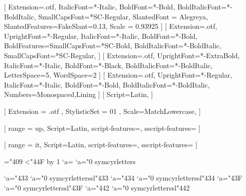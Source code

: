 
% 
%


\setmainfont{Alegreya}[
  Extension=.otf,
  ItalicFont=*-Italic,
  BoldFont=*-Bold,
  BoldItalicFont=*-BoldItalic,
  SmallCapsFont=*SC-Regular,
  SlantedFont = Alegreya,
  SlantedFeatures={FakeSlant=0.13},
  Scale = 0.93925
]
\setsansfont{AlegreyaSans}[
  Extension=.otf,
  UprightFont=*-Regular,
  ItalicFont=*-Italic,
  BoldFont=*-Bold,
  BoldFeatures={SmallCapsFont=*SC-Bold},
  BoldItalicFont=*-BoldItalic,
  SmallCapsFont=*SC-Regular,
]
[
  Extension=.otf,
  UprightFont=*-ExtraBold,
  ItalicFont=*-Italic,
  BoldFont=*-Black,
  BoldItalicFont=*-BoldItalic,
  LetterSpace=5,
  WordSpace=2
]
[
  Extension=.otf,
  UprightFont=*-Regular,
  ItalicFont=*-Italic,
  BoldFont=*-Bold,
  BoldItalicFont=*-BoldItalic,
  Numbers={Monospaced,Lining}
]
[
  Script=Latin,
]

% 
%

\usepackage{unicode-math}

[%
  Extension = .otf ,
  StylisticSet = 01 ,
  Scale=MatchLowercase,
]

[%
  range = {up},
  Script=Latin,
  script-features={},
  sscript-features={}
]

[%
  range = {it},
  Script=Latin,
  script-features={},
  sscript-features={}
]

\newcommand{\makecyrmathletter}[1]{%
  \begingroup\lccode`a=#1\lowercase{\endgroup
  \Umathcode`a}="0 \csname symcyrletters\endcsname\space #1
}
="409
\loop\ifnum{}<"44F
  \advance{} by 1
  \makecyrmathletter{\count255}
\repeat


\newcommand{\makecyrmathlettersl}[1]{%
  \begingroup\lccode`a=#1\lowercase{\endgroup
  \Umathcode`a}="0 \csname symcyrletterssl\endcsname\space #1
}
\makecyrmathlettersl{"433} %
\makecyrmathlettersl{"434} %
\makecyrmathlettersl{"43F} %
\makecyrmathlettersl{"442} %
